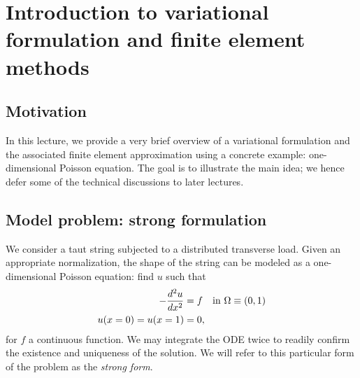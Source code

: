 \chapter{Introduction to variational formulation and finite element methods}

\disclaimer

\section{Motivation}
In this lecture, we provide a very brief overview of a variational formulation and the associated finite element approximation using a concrete example: one-dimensional Poisson equation. The goal is to illustrate the main idea; we hence defer some of the technical discussions to later lectures.

\section{Model problem: strong formulation}
\label{sec:intro_strong}
We consider a taut string subjected to a distributed transverse load.  Given an appropriate normalization, the shape of the string can be modeled as a one-dimensional Poisson equation: find $u$ such that
\begin{align}
  - \frac{d ^2u}{d x^2} &= f \quad \text{in } \Omega \equiv (0,1) \label{eq:intro_strong} \\
  u(x=0) = u(x=1) &= 0 \notag , 
\end{align}
for $f$ a continuous function.  We may integrate the ODE twice to readily confirm the existence and uniqueness of the solution.  We will refer to this particular form of the problem as the \emph{strong form}.


